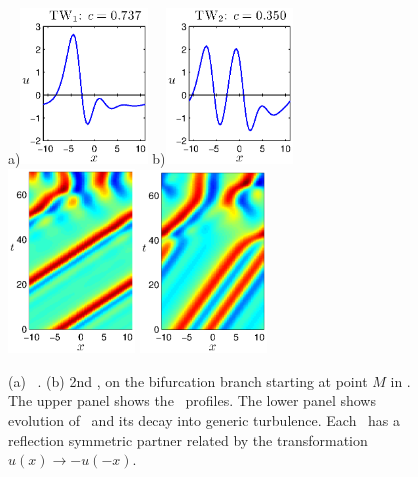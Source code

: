 {%
\begin{figure}[t]
\begin{center}
a)\includegraphics[width=0.3\textwidth]{figs/ks22_TW1_profile.eps}
b)\includegraphics[width=0.3\textwidth]{figs/ks22_TW2_profile.eps}\\
\includegraphics[width=0.3\textwidth]{figs/ks22_TW1_orbit.eps}
\includegraphics[width=0.3\textwidth]{figs/ks22_TW2_orbit.eps}
\end{center}
\caption{
(a)
    \Reqv\ .
(b)
2nd , on the bifurcation branch starting
at point $M$ in .
The upper panel shows
the \reqva\ profiles. The lower panel shows evolution
of \reqva\
and its decay into generic turbulence.
Each \reqv\ has a reflection symmetric partner related by the
transformation $u(x) \to -u(-x)$.
} \label{f:ks22TW}
\end{figure}


}
